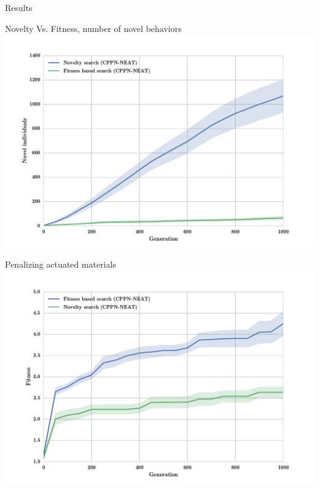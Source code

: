 \documentclass{beamer}
\begin{document}
\begin{frame}[allowframebreaks]{Results}
\begin{minipage}{\textwidth}
\begin{block}{Novelty Vs. Fitness, number of novel behaviors}
\includegraphics[width=1.0\textwidth]{figures/results/novelIndividualsFitNovComp.pdf}
\end{block}
\end{minipage}

\begin{minipage}{\textwidth}
\begin{block}{Penalizing actuated materials}
\includegraphics[width=1.0\textwidth]{figures/results/FitNovSize5Pen2.pdf}
\end{block}
\end{minipage}


\end{frame}
\end{document}
